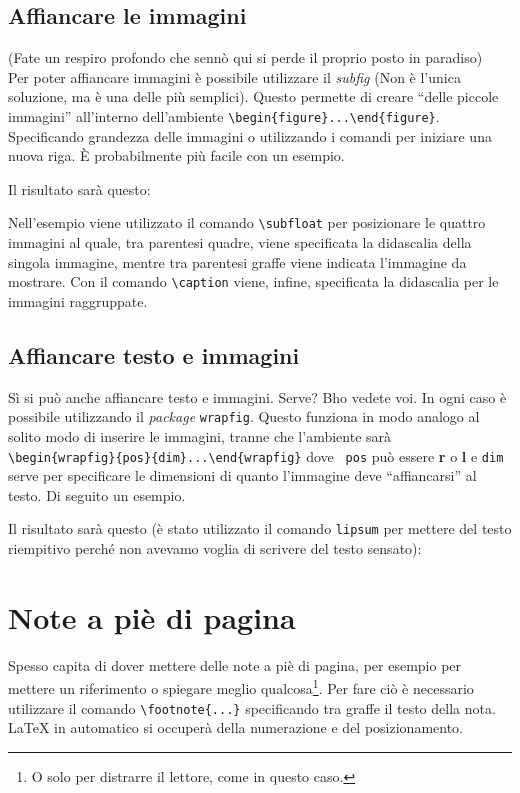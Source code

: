 \subsection{Affiancare le immagini}
(Fate un respiro profondo che sennò qui si perde il proprio posto in paradiso) 
\\
Per poter affiancare immagini è possibile utilizzare il \textit{subfig} (Non è 
l'unica soluzione, ma è una delle più semplici). Questo permette di creare 
``delle piccole immagini'' all'interno dell'ambiente 
\verb!\begin{figure}...\end{figure}!. Specificando grandezza delle immagini o 
utilizzando i comandi per iniziare una nuova riga. È probabilmente più facile 
con un esempio.

Il risultato sarà questo:

Nell'esempio viene utilizzato il comando \verb!\subfloat! per posizionare le 
quattro immagini al quale, tra parentesi quadre, viene specificata la 
didascalia della singola immagine, mentre tra parentesi graffe viene indicata 
l'immagine da mostrare. Con il comando \verb!\caption! viene, infine, 
specificata la didascalia per le immagini raggruppate.

\subsection{Affiancare testo e immagini}
Sì si può anche affiancare testo e immagini. Serve? Bho vedete voi. In ogni 
caso è possibile utilizzando il \textit{package} \verb!wrapfig!. Questo 
funziona in modo analogo al solito modo di inserire le immagini, tranne che 
l'ambiente sarà \\
\verb!\begin{wrapfig}{pos}{dim}...\end{wrapfig}! dove \texttt{
pos} può essere \textbf{r} o \textbf{l} e \texttt{dim} serve per specificare 
le dimensioni di quanto l'immagine deve ``affiancarsi'' al testo. Di seguito 
un esempio. 

Il risultato sarà questo (è stato utilizzato il comando \texttt{lipsum} per 
mettere del testo riempitivo perché non avevamo voglia di scrivere del testo 
sensato):
\newpage

\newpage

\section{Note a piè di pagina}
Spesso capita di dover mettere delle note a piè di pagina, per esempio per 
mettere un riferimento o spiegare meglio qualcosa\footnote{O solo per 
distrarre il lettore, come in questo caso.}. Per fare ciò è necessario 
utilizzare il comando \verb!\footnote{...}! specificando tra graffe il testo 
della nota. \LaTeX{} in automatico si occuperà della numerazione e del 
posizionamento.


